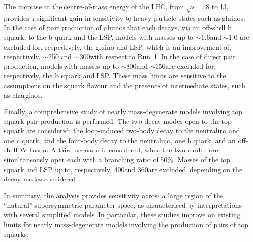 The increase in the centre-of-mass energy of the LHC, from $\sqrt{s} =
8$ to 13\TeV, provides a significant gain in sensitivity to heavy
particle states such as gluinos. In the case of pair production of
gluinos that each decays, via an off-shell b squark, to the b quark
and the LSP, models with masses up to $\sim$1.6\TeV and $\sim$1.0\TeV
are excluded for, respectively, the gluino and LSP, which is an
improvement of, respectively, $\sim$250 and $\sim$300\GeV with respect
to Run~1. In the case of direct pair production, models with masses up
to $\sim$800\GeV and $\sim$350\GeV are excluded for, respectively, the
b squark and LSP. These mass limits are sensitive to the assumptions
on the squark flavour and the presence of intermediate states, such as
charginos.

Finally, a comprehensive study of nearly mass-degenerate models
involving top squark pair production is performed. The two decay modes
open to the top squark are considered: the loop-induced two-body decay
to the neutralino and one c quark, and the four-body decay to the
neutralino, one b quark, and an off-shell W boson. A third scenario is
considered, when the two modes are simultaneously open each with a
branching ratio of 50\%. Masses of the top squark and LSP up to,
respectively, 400\GeV and 360\GeV are excluded, depending on the decay
modes considered.

In summary, the analysis provides sensitivity across a large region of
the ``natural'' supersymmetric parameter space, as characterised by
interpretations with several simplified models. In particular, these
studies improve on existing limits for nearly mass-degenerate models
involving the production of pairs of top squarks.
